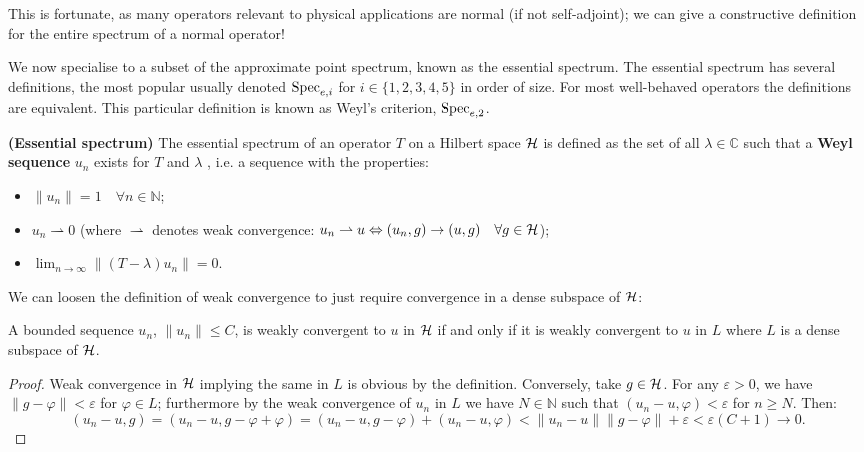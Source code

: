 \documentclass[../main.tex]{subfiles}
\begin{document}
This is fortunate, as many operators relevant to physical applications are
normal (if not self-adjoint); we can give a constructive definition for the
entire spectrum of a normal operator! 

We now specialise to a subset of the approximate point spectrum, known as the
essential spectrum. The essential spectrum has several definitions, 
the most popular usually denoted $\mathrm{Spec}_{e,i}$ for $i \in \{1,2,3,4,5\}$ in order of size. For 
most well-behaved operators the definitions are equivalent. This particular definition 
is known as Weyl's criterion, $\mathrm{Spec}_{e, 2}$. \cite{edmunds2018spectral}

\begin{definition}{\textbf{(Essential spectrum)}}
  The essential spectrum of an operator $T$ on a Hilbert space $\mathcal{H}$ is
  defined as the set of all $\lambda \in \mathbb{C}$ such that a
  \textbf{Weyl sequence} $u_n$ exists for $T$ and
  $\lambda$ , i.e. a sequence with the properties:
  \begin{itemize}
    \item $\|u_n\| = 1\quad \forall n \in \mathbb{N}$;
    \item $u_n \rightharpoonup 0$ (where $\rightharpoonup$ denotes weak convergence:
	  $u_n \rightharpoonup u \Leftrightarrow (u_n, g) \rightarrow (u, g) \quad \forall g \in \mathcal{H}$);
    \item $\lim_{n \rightarrow \infty}\|(T - \lambda)u_n\|  = 0$.
  \end{itemize}
\end{definition}

We can loosen the definition of weak convergence to just require convergence in
a dense subspace of $\mathcal{H}$:
\begin{lemma}
\label{thm:weak-conv-dense-subset}
  A bounded sequence $u_n$, $\|u_n\| \leq C$, is weakly convergent to $u$ in
  $\mathcal{H}$ if and only if it is weakly convergent to $u$ in $L$ where $L$ is a
  dense subspace of $\mathcal{H}$. \end{lemma}
\begin{proof}
Weak convergence in $\mathcal{H}$ implying the same in $L$ is obvious by the
definition.
Conversely, take $g \in \mathcal{H}$. For any $\varepsilon > 0$, we have 
$\|g - \varphi\| < \varepsilon$ for $\varphi \in L$;
furthermore by the weak convergence of $u_n$ in $L$ we have $N \in
\mathbb{N}$ such that $(u_n - u, \varphi) < \varepsilon$ for $n \geq N$.
Then:
$$( u_n - u, g ) = ( u_n - u, g - \varphi + \varphi ) 
		 = ( u_n - u, g - \varphi ) + ( u_n - u, \varphi ) 
		 < \|u_n - u\| \|g - \varphi\| + \varepsilon < \varepsilon(C + 1) 
		 \rightarrow 0.$$
\end{proof}
\end{document}
